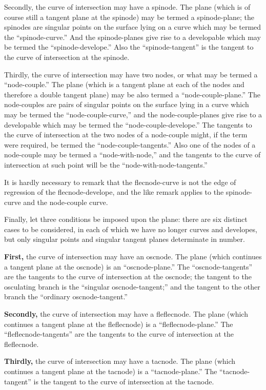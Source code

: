 \documentclass[11pt,a4paper]{article}
\theoremstyle{plain}
\begin{document}
Secondly, the curve of intersection may have a spinode. The plane (which is of course still a tangent plane at the spinode) may be termed a spinode-plane; the spinodes are singular points on the surface lying on a curve which may be termed the ``spinode-curve.'' And the spinode-planes give rise to a developable which may be termed the ``spinode-develope.'' Also the ``spinode-tangent'' is the tangent to the curve of intersection at the spinode.

Thirdly, the curve of intersection may have two nodes, or what may be termed a ``node-couple.'' The plane (which is a tangent plane at each of the nodes and therefore a double tangent plane) may be also termed a ``node-couple-plane.'' The node-couples are pairs of singular points on the surface lying in a curve which may be termed the ``node-couple-curve,'' and the node-couple-planes give rise to a developable which may be termed the ``node-couple-develope.'' The tangents to the curve of intersection at the two nodes of a node-couple might, if the term were required, be termed the ``node-couple-tangents.'' Also one of the nodes of a node-couple may be termed a ``node-with-node,'' and the tangents to the curve of intersection at such point will be the ``node-with-node-tangents.''

It is hardly necessary to remark that the flecnode-curve is not the edge of regression of the flecnode-develope, and the like remark applies to the spinode-curve and the node-couple curve.

Finally, let three conditions be imposed upon the plane: there are six distinct cases to be considered, in each of which we have no longer curves and developes, but only singular points and singular tangent planes determinate in number.

\textbf{First,} the curve of intersection may have an oscnode. The plane (which continues a tangent plane at the oscnode) is an ``oscnode-plane.'' The ``oscnode-tangents'' are the tangents to the curve of intersection at the oscnode; the tangent to the osculating branch is the ``singular oscnode-tangent;'' and the tangent to the other branch the ``ordinary oscnode-tangent.''

\textbf{Secondly,} the curve of intersection may have a fleflecnode. The plane (which continues a tangent plane at the fleflecnode) is a ``fleflecnode-plane.'' The ``fleflecnode-tangents'' are the tangents to the curve of intersection at the fleflecnode.

\textbf{Thirdly,} the curve of intersection may have a tacnode. The plane (which continues a tangent plane at the tacnode) is a ``tacnode-plane.'' The ``tacnode-tangent'' is the tangent to the curve of intersection at the tacnode.
\end{document}

